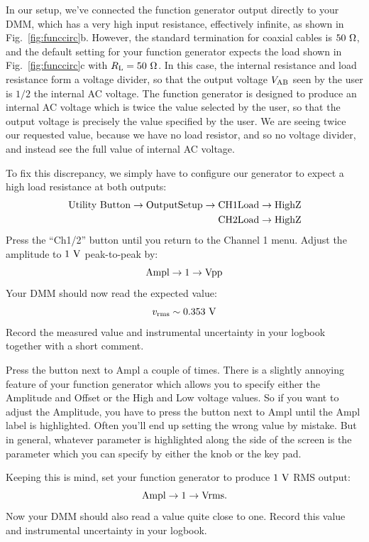 In our setup, we've connected the function generator output directly
to your DMM, which has a very high input resistance, effectively
infinite, as shown in Fig.~\ref{fig:funccirc}b.  However, the standard
termination for coaxial cables is $50~\rm \Omega$, and the default
setting for your function generator expects the load shown in
Fig.~\ref{fig:funccirc}c with $R_{\rm L} = 50~\rm \Omega$.  In
this case, the internal resistance and load resistance form a voltage
divider, so that the output voltage $V_{\rm AB}$ seen by the user is
$1/2$ the internal AC voltage. The function generator is designed to
produce an internal AC voltage which is twice the value selected by
the user, so that the output voltage is precisely the value specified
by the user.  We are seeing twice our requested value, because we have
no load resistor, and so no voltage divider, and instead see the full
value of internal AC voltage.  
\begin{measurement} To fix this discrepancy, we simply have
to configure our generator to expect a high load resistance at both
outputs:
\begin{eqnarray*}
{\rm Utility~Button \to Output Setup \to CH1Load \to HighZ} \\
{\rm CH2Load \to HighZ}
\end{eqnarray*}
Press the ``Ch1/2'' button until you return to the Channel 1 menu.  Adjust the amplitude to $1~{\rm V}$ peak-to-peak by:
\begin{displaymath}
\rm Ampl \to 1 \to Vpp
\end{displaymath}
Your DMM should now read the expected value:
\begin{displaymath}
v_{\rm rms} \sim 0.353~\rm V
\end{displaymath}
Record the measured value and instrumental uncertainty in your logbook together with a short comment. 
\end{measurement}

Press the button next to Ampl a couple of times.  There is a slightly
annoying feature of your function generator which allows you to
specify either the Amplitude and Offset or the High and Low voltage
values.  So if you want to adjust the Amplitude, you have to press the
button next to Ampl until the Ampl label is highlighted.  Often you'll
end up setting the wrong value by mistake.  But in general, whatever
parameter is highlighted along the side of the screen is the parameter
which you can specify by either the knob or the key pad.  
\begin{measurement} Keeping this
is mind, set your function generator to produce $1~\rm V$ RMS output:
\begin{displaymath}
\rm Ampl \to 1 \to Vrms.
\end{displaymath}
Now your DMM should also read a value quite close to one. Record this value and instrumental uncertainty in your logbook. 
\end{measurement}

